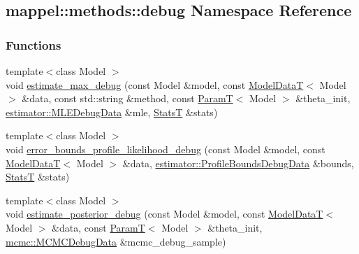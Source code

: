 \hypertarget{namespacemappel_1_1methods_1_1debug}{}\subsection{mappel\+:\+:methods\+:\+:debug Namespace Reference}
\label{namespacemappel_1_1methods_1_1debug}
\subsubsection*{Functions}
\begin{DoxyCompactItemize}
\item 
{\footnotesize template$<$class Model $>$ }\\void \hyperlink{namespacemappel_1_1methods_1_1debug_a38de1b4f98bfb724874fec99b53a8554}{estimate\+\_\+max\+\_\+debug} (const Model \&model, const \hyperlink{namespacemappel_a97f050df953605381ae9c901c3b125f1}{Model\+DataT}$<$ Model $>$ \&data, const std\+::string \&method, const \hyperlink{namespacemappel_a667925cb0d6c0e49f2f035cc5a9a6857}{ParamT}$<$ Model $>$ \&theta\+\_\+init, \hyperlink{namespacemappel_1_1estimator_structmappel_1_1estimator_1_1MLEDebugData}{estimator\+::\+M\+L\+E\+Debug\+Data} \&mle, \hyperlink{namespacemappel_a04ab395b0cf82c4ce68a36b2212649a5}{StatsT} \&stats)
\item 
{\footnotesize template$<$class Model $>$ }\\void \hyperlink{namespacemappel_1_1methods_1_1debug_a3fc6147e9b38e7b8328eb421be81a200}{error\+\_\+bounds\+\_\+profile\+\_\+likelihood\+\_\+debug} (const Model \&model, const \hyperlink{namespacemappel_a97f050df953605381ae9c901c3b125f1}{Model\+DataT}$<$ Model $>$ \&data, \hyperlink{namespacemappel_1_1estimator_structmappel_1_1estimator_1_1ProfileBoundsDebugData}{estimator\+::\+Profile\+Bounds\+Debug\+Data} \&bounds, \hyperlink{namespacemappel_a04ab395b0cf82c4ce68a36b2212649a5}{StatsT} \&stats)
\item 
{\footnotesize template$<$class Model $>$ }\\void \hyperlink{namespacemappel_1_1methods_1_1debug_a5d84632af17af6d244b5a82b9d55f2ba}{estimate\+\_\+posterior\+\_\+debug} (const Model \&model, const \hyperlink{namespacemappel_a97f050df953605381ae9c901c3b125f1}{Model\+DataT}$<$ Model $>$ \&data, const \hyperlink{namespacemappel_a667925cb0d6c0e49f2f035cc5a9a6857}{ParamT}$<$ Model $>$ \&theta\+\_\+init, \hyperlink{structmappel_1_1mcmc_1_1MCMCDebugData}{mcmc\+::\+M\+C\+M\+C\+Debug\+Data} \&mcmc\+\_\+debug\+\_\+sample)
\end{DoxyCompactItemize}


